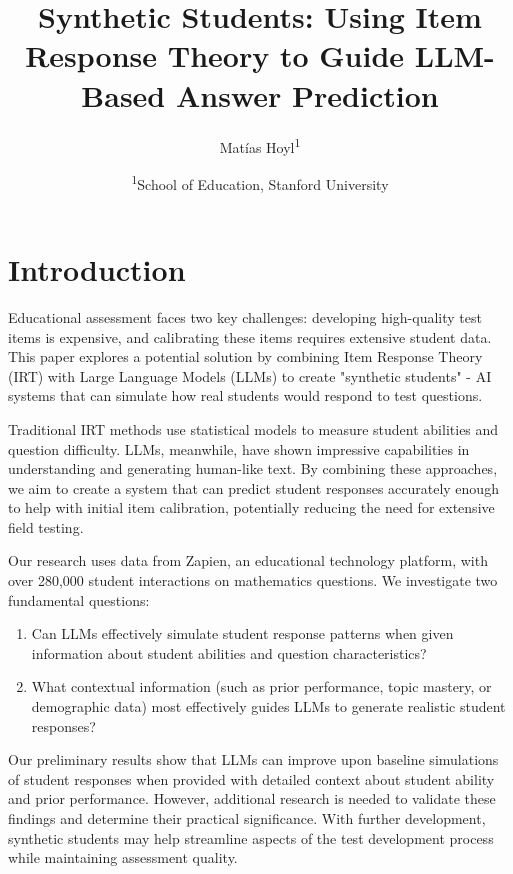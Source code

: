 \documentclass[
    a4paper, %
    10pt, %
    twoside, %
]{LTJournalArticle}
\title{Synthetic Students: Using Item Response Theory to Guide LLM-Based Answer Prediction}
\author{%
    Matías Hoyl\textsuperscript{1} 
}
\date{\footnotesize \textsuperscript{1}School of Education, Stanford University}
\begin{document}
\maketitle

\section{Introduction}

Educational assessment faces two key challenges: developing high-quality test items is expensive, and calibrating these items requires extensive student data. This paper explores a potential solution by combining Item Response Theory (IRT) with Large Language Models (LLMs) to create "synthetic students" - AI systems that can simulate how real students would respond to test questions.

Traditional IRT methods use statistical models to measure student abilities and question difficulty. LLMs, meanwhile, have shown impressive capabilities in understanding and generating human-like text. By combining these approaches, we aim to create a system that can predict student responses accurately enough to help with initial item calibration, potentially reducing the need for extensive field testing.

Our research uses data from Zapien, an educational technology platform, with over 280,000 student interactions on mathematics questions. We investigate two fundamental questions:

\begin{enumerate}
    \item Can LLMs effectively simulate student response patterns when given information about student abilities and question characteristics?
    \item What contextual information (such as prior performance, topic mastery, or demographic data) most effectively guides LLMs to generate realistic student responses?
\end{enumerate}

Our preliminary results show that LLMs can improve upon baseline simulations of student responses when provided with detailed context about student ability and prior performance. However, additional research is needed to validate these findings and determine their practical significance. With further development, synthetic students may help streamline aspects of the test development process while maintaining assessment quality.
\end{document}
